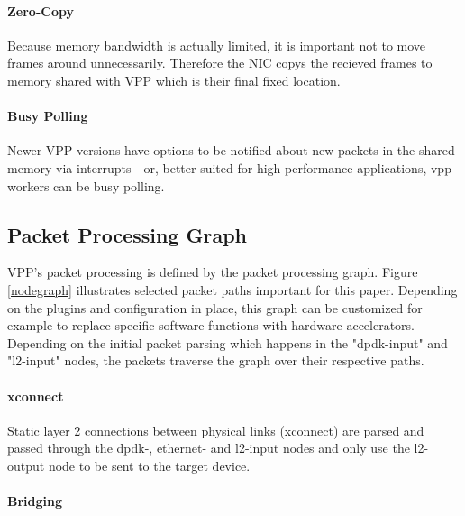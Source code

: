 \paragraph{Zero-Copy}

Because memory bandwidth is actually limited, it is important not to
move frames around unnecessarily. Therefore the NIC copys the recieved
frames to memory shared with VPP which is their final fixed
location. \cite{linguaglossa2017high}

\paragraph{Busy Polling}

Newer VPP versions have options to be notified about new packets in
the shared memory via interrupts - or, better suited for high
performance applications, vpp workers can be busy polling.


\subsection{Packet Processing Graph}


VPP's packet processing is defined by the packet processing graph.
Figure \ref{nodegraph} illustrates selected packet paths important for
this paper. Depending on the plugins and configuration in place, this
graph can be customized for example to replace specific software
functions with hardware accelerators. Depending on the initial packet
parsing which happens in the "dpdk-input" and "l2-input" nodes, the
packets traverse the graph over their respective paths.

\paragraph{xconnect}

Static layer 2 connections between physical links (xconnect) are
parsed and passed through the dpdk-, ethernet- and l2-input nodes and
only use the l2-output node to be sent to the target device.

\paragraph{Bridging}

